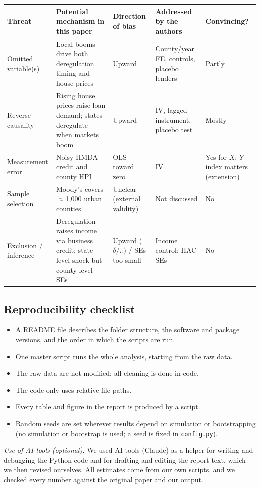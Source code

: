 \documentclass[12pt,a4paper]{article}
\renewcommand{\arraystretch}{1.25}
\begin{document}
{\renewcommand{\arraystretch}{1.4}%
\begin{tabularx}{\textwidth}{@{}>{\raggedright\arraybackslash}p{}
  L
  >{\raggedright\arraybackslash}p{0.13\textwidth}
  L
  >{\raggedright\arraybackslash}p{0.14\textwidth}@{}}
\toprule
Threat & Potential mechanism in this paper & Direction of bias & Addressed by the authors & Convincing? \\
\midrule
Omitted variable(s) & Local booms drive both deregulation timing and house prices & Upward & County/year FE, controls, placebo lenders & Partly \\
Reverse causality & Rising house prices raise loan demand; states deregulate when markets boom & Upward & IV, lagged instrument, placebo test & Mostly \\
Measurement error & Noisy HMDA credit and county HPI & OLS toward zero & IV & Yes for $X$; $Y$ index matters (extension) \\
Sample selection & Moody's covers $\approx$1,000 urban counties & Unclear (external validity) & Not discussed & No \\
Exclusion / inference & Deregulation raises income via business credit; state-level shock but county-level SEs & Upward ($\delta/\pi$) / SEs too small & Income control; HAC SEs & No \\
\bottomrule
\end{tabularx}}

\subsection{Reproducibility checklist}

\begin{itemize}[label=$\boxtimes$, leftmargin=*, itemsep=2pt]
  \item A README file describes the folder structure, the software and package versions, and the order in which the scripts are run.
  \item One master script runs the whole analysis, starting from the raw data.
  \item The raw data are not modified; all cleaning is done in code.
  \item The code only uses relative file paths.
  \item Every table and figure in the report is produced by a script.
  \item Random seeds are set wherever results depend on simulation or bootstrapping (no simulation or bootstrap is used; a seed is fixed in \texttt{config.py}).
\end{itemize}

\textit{Use of AI tools (optional).} We used AI tools (Claude) as a helper for writing and debugging the Python code and for drafting and editing the report text, which we then revised ourselves. All estimates come from our own scripts, and we checked every number against the original paper and our output.
\end{document}
